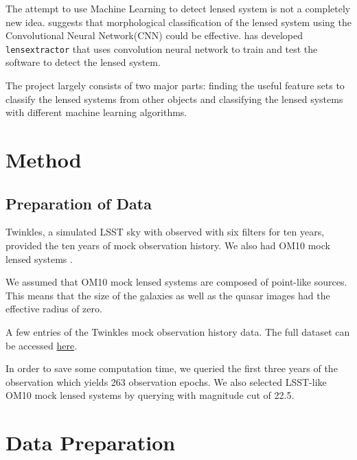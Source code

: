 \documentclass[\docopts]{\docclass}
\begin{document}
The attempt to use Machine Learning to detect lensed system is not a
completely new idea. \citep{convolution_neural_network} suggests that
morphological classification of the lensed system using the
Convolutional Neural Network(CNN) could be effective.
\citep{LensExtractor} has developed \texttt{lensextractor} that uses
convolution neural network to train and test the software to detect the
lensed system.

The \SLRealizer project largely consists of two major parts: finding the
useful feature sets to classify the lensed systems from other objects
and classifying the lensed systems with different machine learning
algorithms.



\section{Method}
\label{sec:method}

\subsection{Preparation of Data}
\label{subsec:dataprep}

Twinkles, a simulated LSST sky with observed with six filters for ten
years, provided the ten years of mock observation history. We also had
OM10 mock lensed systems \cite{TimeDelayOverall}.

We assumed that OM10 mock lensed systems are composed of point-like
sources. This means that the size of the galaxies as well as the quasar
images had the effective radius of zero.

\begin{table}[!h]
\caption{A few entries of the Twinkles mock observation history data.
The full dataset can be accessed
\href{https://github.com/LSSTDESC/SLRealizer/blob/master/data/twinkles_observation_history.csv}{here}.}
\end{table}

In order to save some computation time, we queried the first three years
of the observation which yields 263 observation epochs. We also selected
LSST-like OM10 mock lensed systems by querying with magnitude cut of
22.5.


\section{Data Preparation}
\label{sssec:catalog}
\end{document}
